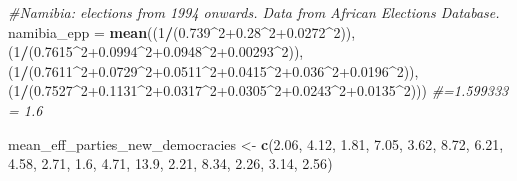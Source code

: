 \documentclass[]{article}
\newenvironment{Shaded}{\begin{snugshade}}{\end{snugshade}}
\newcommand{\CommentTok}[1]{\textcolor[rgb]{0.56,0.35,0.01}{\textit{#1}}}
\newcommand{\DecValTok}[1]{\textcolor[rgb]{0.00,0.00,0.81}{#1}}
\newcommand{\FloatTok}[1]{\textcolor[rgb]{0.00,0.00,0.81}{#1}}
\newcommand{\KeywordTok}[1]{\textcolor[rgb]{0.13,0.29,0.53}{\textbf{#1}}}
\newcommand{\NormalTok}[1]{#1}
\newcommand{\OperatorTok}[1]{\textcolor[rgb]{0.81,0.36,0.00}{\textbf{#1}}}
\newcommand{\StringTok}[1]{\textcolor[rgb]{0.31,0.60,0.02}{#1}}
\begin{document}
\begin{Shaded}
\begin{Highlighting}[]
{{{\CommentTok{#Namibia: elections from 1994 onwards. Data from African Elections Database.}
\NormalTok{namibia_epp =}\StringTok{ }\KeywordTok{mean}\NormalTok{((}\DecValTok{1}\OperatorTok{/}\NormalTok{(}\FloatTok{0.739}\OperatorTok{^}\DecValTok{2}\FloatTok{+0.28}\OperatorTok{^}\DecValTok{2}\FloatTok{+0.0272}\OperatorTok{^}\DecValTok{2}\NormalTok{)), (}\DecValTok{1}\OperatorTok{/}\NormalTok{(}\FloatTok{0.7615}\OperatorTok{^}\DecValTok{2}\FloatTok{+0.0994}\OperatorTok{^}\DecValTok{2}\FloatTok{+0.0948}\OperatorTok{^}\DecValTok{2}\FloatTok{+0.00293}\OperatorTok{^}\DecValTok{2}\NormalTok{)),}
\NormalTok{                   (}\DecValTok{1}\OperatorTok{/}\NormalTok{(}\FloatTok{0.7611}\OperatorTok{^}\DecValTok{2}\FloatTok{+0.0729}\OperatorTok{^}\DecValTok{2}\FloatTok{+0.0511}\OperatorTok{^}\DecValTok{2}\FloatTok{+0.0415}\OperatorTok{^}\DecValTok{2}\FloatTok{+0.036}\OperatorTok{^}\DecValTok{2}\FloatTok{+0.0196}\OperatorTok{^}\DecValTok{2}\NormalTok{)),}
\NormalTok{                   (}\DecValTok{1}\OperatorTok{/}\NormalTok{(}\FloatTok{0.7527}\OperatorTok{^}\DecValTok{2}\FloatTok{+0.1131}\OperatorTok{^}\DecValTok{2}\FloatTok{+0.0317}\OperatorTok{^}\DecValTok{2}\FloatTok{+0.0305}\OperatorTok{^}\DecValTok{2}\FloatTok{+0.0243}\OperatorTok{^}\DecValTok{2}\FloatTok{+0.0135}\OperatorTok{^}\DecValTok{2}\NormalTok{)))}
\CommentTok{#=1.599333 = 1.6}

\NormalTok{mean_eff_parties_new_democracies <-}\StringTok{ }\KeywordTok{c}\NormalTok{(}\FloatTok{2.06}\NormalTok{, }\FloatTok{4.12}\NormalTok{, }\FloatTok{1.81}\NormalTok{, }\FloatTok{7.05}\NormalTok{, }\FloatTok{3.62}\NormalTok{, }\FloatTok{8.72}\NormalTok{, }\FloatTok{6.21}\NormalTok{, }\FloatTok{4.58}\NormalTok{,}
                                      \FloatTok{2.71}\NormalTok{, }\FloatTok{1.6}\NormalTok{, }\FloatTok{4.71}\NormalTok{, }\FloatTok{13.9}\NormalTok{, }\FloatTok{2.21}\NormalTok{, }\FloatTok{8.34}\NormalTok{, }\FloatTok{2.26}\NormalTok{, }\FloatTok{3.14}\NormalTok{, }\FloatTok{2.56}\NormalTok{)}

}}}
\end{Highlighting}
\end{Shaded}
\end{document}
